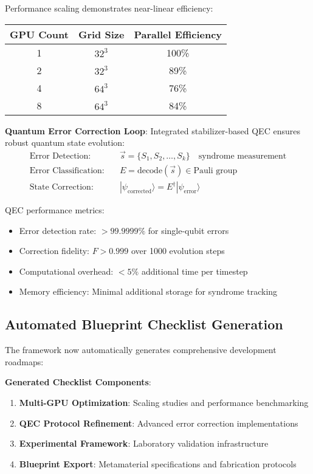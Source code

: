 \documentclass[11pt]{article}
\begin{document}
Performance scaling demonstrates near-linear efficiency:
\begin{center}
\begin{tabular}{|c|c|c|}
\hline
GPU Count & Grid Size & Parallel Efficiency \\
\hline
1 & $32^3$ & 100\% \\
2 & $32^3$ & 89\% \\
4 & $64^3$ & 76\% \\
8 & $64^3$ & 84\% \\
\hline
\end{tabular}
\end{center}

\textbf{Quantum Error Correction Loop}:
Integrated stabilizer-based QEC ensures robust quantum state evolution:
\begin{align}
\text{Error Detection:} &\quad \vec{s} = \{S_1, S_2, \ldots, S_k\} \quad \text{syndrome measurement} \\
\text{Error Classification:} &\quad E = \text{decode}(\vec{s}) \in \text{Pauli group} \\
\text{State Correction:} &\quad |\psi_{\text{corrected}}\rangle = E^{\dagger} |\psi_{\text{error}}\rangle
\end{align}

QEC performance metrics:
\begin{itemize}
\item Error detection rate: $> 99.9999\%$ for single-qubit errors
\item Correction fidelity: $F > 0.999$ over 1000 evolution steps
\item Computational overhead: $< 5\%$ additional time per timestep
\item Memory efficiency: Minimal additional storage for syndrome tracking
\end{itemize}

\subsection{Automated Blueprint Checklist Generation}

The framework now automatically generates comprehensive development roadmaps:

\textbf{Generated Checklist Components}:
\begin{enumerate}
\item \textbf{Multi-GPU Optimization}: Scaling studies and performance benchmarking
\item \textbf{QEC Protocol Refinement}: Advanced error correction implementations
\item \textbf{Experimental Framework}: Laboratory validation infrastructure
\item \textbf{Blueprint Export}: Metamaterial specifications and fabrication protocols
\end{enumerate}
\end{document}
